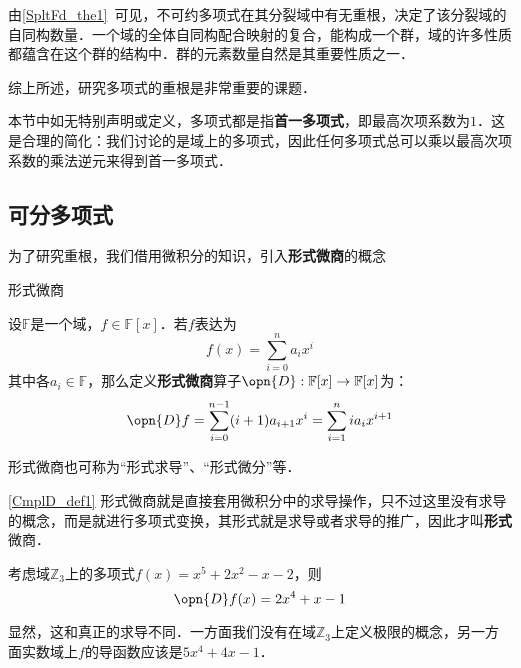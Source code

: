 


由\autoref{SpltFd_the1}~可见，不可约多项式在其分裂域中有无重根，决定了该分裂域的自同构数量．一个域的全体自同构配合映射的复合，能构成一个群，域的许多性质都蕴含在这个群的结构中．群的元素数量自然是其重要性质之一．

综上所述，研究多项式的重根是非常重要的课题．

本节中如无特别声明或定义，多项式都是指\textbf{首一多项式}，即最高次项系数为$1$．这是合理的简化：我们讨论的是域上的多项式，因此任何多项式总可以乘以最高次项系数的乘法逆元来得到首一多项式．

\subsection{可分多项式}

为了研究重根，我们借用微积分的知识，引入\textbf{形式微商}的概念

\begin{definition}{形式微商}\label{CmplD_def1}

设$\mathbb{F}$是一个域，$f\in\mathbb{F}[x]$．若$f$表达为
\begin{equation}
f(x) = \sum_{i=0}^n a_ix^i
\end{equation}
其中各$a_i\in\mathbb{F}$，那么定义\textbf{形式微商}算子$\opn{D}:\mathbb{F}[x]\to\mathbb{F}[x]$为：
\begin{equation}
\opn{D}f = \sum_{i=0}^{n-1} (i+1)a_{i+1}x^i = \sum_{i=1}^{n} ia_{i}x^{i+1}
\end{equation}

形式微商也可称为“形式求导”、“形式微分”等．

\end{definition}

\autoref{CmplD_def1} 形式微商就是直接套用微积分中的求导操作，只不过这里没有求导的概念，而是就进行多项式变换，其形式就是求导或者求导的推广，因此才叫\textbf{形式}微商．

\begin{example}{}
考虑域$\mathbb{Z}_3$上的多项式$f(x)=x^5+2x^2-x-2$，则
\begin{equation}
\opn{D}f(x) = 2x^4+x-1
\end{equation}

显然，这和真正的求导不同．一方面我们没有在域$\mathbb{Z}_3$上定义极限的概念，另一方面实数域上$f$的导函数应该是$5x^4+4x-1$．
\end{example}

